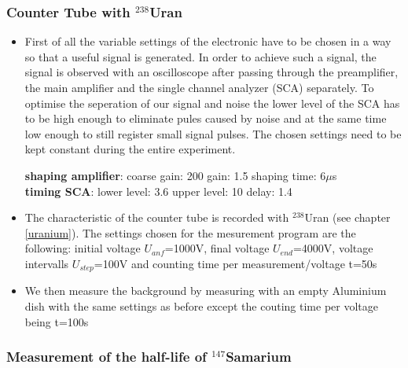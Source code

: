\documentclass[12pt]{article}
\begin{document}
\subsubsection{Counter Tube with ${}^{238}$Uran}\label{durchfuehrunguran}
\begin{itemize}
	\item First of all the variable settings of the electronic have to be chosen in a way so that a useful signal is generated. In order to achieve such a signal, the signal is observed with an oscilloscope after passing through the preamplifier, the main amplifier and the single channel analyzer (SCA) separately. To optimise the seperation of our signal and noise the lower level of the SCA has to be high enough to eliminate pules caused by noise and at the same time low enough to still register small signal pulses. The chosen settings need to be kept constant during the entire experiment.
	
		\textbf{shaping amplifier}: coarse gain: 200 \hspace{1.5cm} gain: 1.5 \hspace{1cm} shaping time: 6$\mu$s\\
		\textbf{timing SCA}: \hspace{1cm} lower level: 3.6 \hspace{0.5cm} upper level: 10 \hspace{2.5cm} delay: 1.4
	
	\item The characteristic of the counter tube is recorded with ${}^{238}$Uran (see chapter \ref{uranium}). The settings chosen for the mesurement program are the following: initial voltage $U_{anf}$=1000V, final voltage $U_{end}$=4000V, voltage intervalls $U_{step}$=100V and counting time per measurement/voltage t=50s
	
	\item We then measure the background by measuring with an empty Aluminium dish with the same settings as before except the couting time per voltage being t=100s
\end{itemize}



\subsubsection{Measurement of the half-life of ${}^{147}$Samarium}\label{durchfuehrungsamarium}
\end{document}
